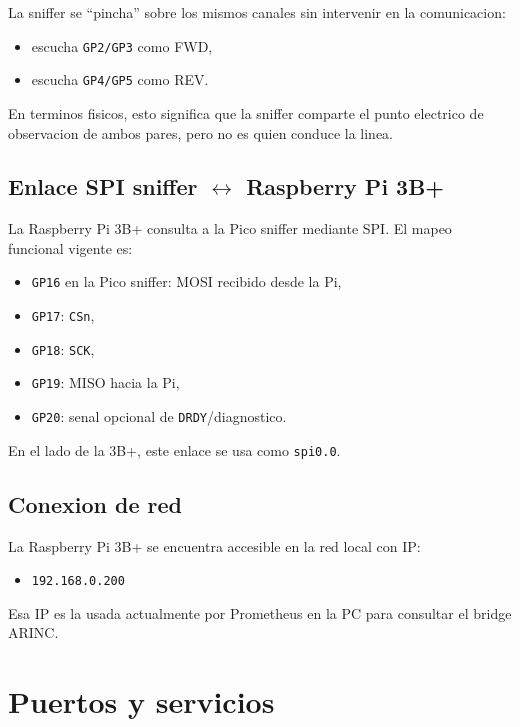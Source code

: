 \documentclass[12pt,a4paper]{report}
\begin{document}
La sniffer se ``pincha'' sobre los mismos canales sin intervenir en la comunicacion:

\begin{itemize}
    \item escucha \texttt{GP2/GP3} como FWD,
    \item escucha \texttt{GP4/GP5} como REV.
\end{itemize}

En terminos fisicos, esto significa que la sniffer comparte el punto electrico de observacion de ambos pares, pero no es quien conduce la linea.

\section{Enlace SPI sniffer $\leftrightarrow$ Raspberry Pi 3B+}

La Raspberry Pi 3B+ consulta a la Pico sniffer mediante SPI. El mapeo funcional vigente es:

\begin{itemize}
    \item \texttt{GP16} en la Pico sniffer: MOSI recibido desde la Pi,
    \item \texttt{GP17}: \texttt{CSn},
    \item \texttt{GP18}: \texttt{SCK},
    \item \texttt{GP19}: MISO hacia la Pi,
    \item \texttt{GP20}: senal opcional de \texttt{DRDY}/diagnostico.
\end{itemize}

En el lado de la 3B+, este enlace se usa como \texttt{spi0.0}.

\section{Conexion de red}

La Raspberry Pi 3B+ se encuentra accesible en la red local con IP:

\begin{itemize}
    \item \texttt{192.168.0.200}
\end{itemize}

Esa IP es la usada actualmente por Prometheus en la PC para consultar el bridge ARINC.

\chapter{Puertos y servicios}
\end{document}
